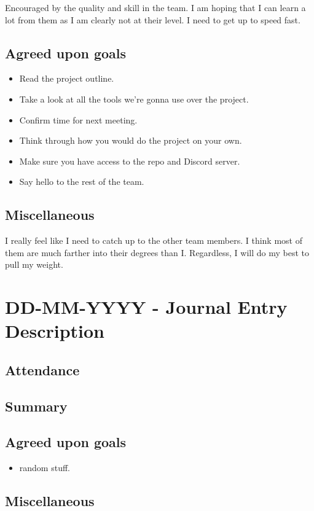 \documentclass[12pt]{article}
\begin{document}
Encouraged by the quality and skill in the team. I am hoping that I can learn a lot from them as I am clearly not at their level. I need to get up to speed fast.

\subsection{Agreed upon goals}
\begin{itemize}
\item Read the project outline.
\item Take a look at all the tools we're gonna use over the project.
\item Confirm time for next meeting.
\item Think through how you would do the project on your own. 
\item Make sure you have access to the repo and Discord server. 
\item Say hello to the rest of the team.
\end{itemize}

\subsection{Miscellaneous}
I really feel like I need to catch up to the other team members. I think most of them are much farther into their degrees than I. Regardless, I will do my best to pull my weight.

\pagebreak

\section{DD-MM-YYYY - Journal Entry Description}

\subsection{Attendance}

\subsection{Summary}

\subsection{Agreed upon goals}
\begin{itemize}
\item random stuff.
\end{itemize}

\subsection{Miscellaneous}

\pagebreak
\end{document}
